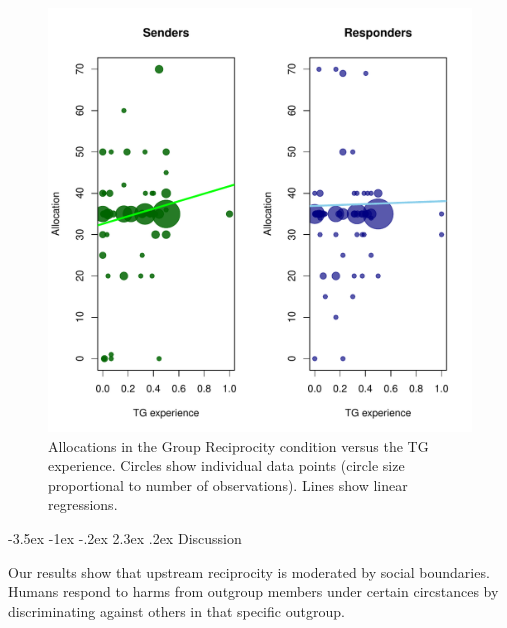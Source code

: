 \documentclass[12pt,a4paper]{article}\usepackage[]{graphicx}\usepackage[]{color}
\makeatletter
\def\maxwidth{ %
  \ifdim\Gin@nat@width>\linewidth
    \linewidth
  \else
    \Gin@nat@width
  \fi
}
\newenvironment{knitrout}{}{} %
\renewcommand\section{\@startsection {section}{1}{\z@}%
{-3.5ex \@plus -1ex \@minus -.2ex}%
{2.3ex \@plus.2ex}%
{\bf\sffamily\Large}}
\makeatother
\begin{document}
\begin{knitrout}
\color{fgcolor}\begin{figure}
\includegraphics[width=\maxwidth]{figure/plots-1} \caption[Allocations in the Group Reciprocity condition versus the TG experience]{Allocations in the Group Reciprocity condition versus the TG experience. Circles show individual data points (circle size proportional to number of observations). Lines show linear regressions.}\label{fig:plots}
\end{figure}


\end{knitrout}

\section{Discussion}
\label{sec:conclusion}

Our results show that upstream reciprocity is moderated by social boundaries. 
Humans respond to harms from outgroup members under certain circstances by discriminating against others in that specific outgroup. 
\end{document}
